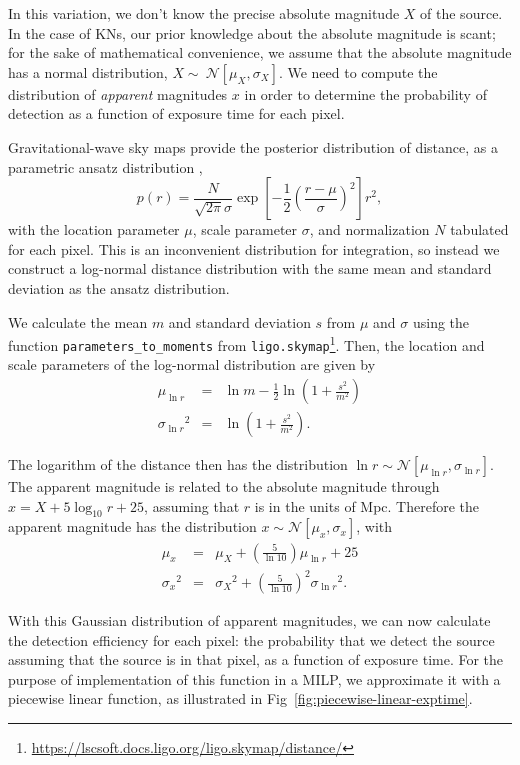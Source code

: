 \documentclass[twocolumn,times]{aastex631}
\begin{document}
In this variation, we don't know the precise absolute magnitude $X$ of the source. In the case of \acp{KN}, our prior knowledge about the absolute magnitude is scant; for the sake of mathematical convenience, we assume that the absolute magnitude has a normal distribution, $X \sim~ \mathcal{N}[\mu_X, \sigma_X]$. We need to compute the distribution of \textit{apparent} magnitudes $x$ in order to determine the probability of detection as a function of exposure time for each pixel.

Gravitational-wave sky maps provide the posterior distribution of distance, as a parametric ansatz distribution \citep{2016ApJ...829L..15S,2016ApJS..226...10S},
%
$$
    p(r) = \frac{N}{\sqrt{2 \pi}\sigma} \exp\left[-\frac{1}{2}\left(\frac{r - \mu}{\sigma}\right)^2\right] r^2,
$$
%
with the location parameter $\mu$, scale parameter $\sigma$, and normalization $N$ tabulated for each pixel. This is an inconvenient distribution for integration, so instead we construct a log-normal distance distribution with the same mean and standard deviation as the ansatz distribution.

We calculate the mean $m$ and standard deviation $s$ from $\mu$ and $\sigma$ using the function \texttt{parameters\_to\_moments} from \texttt{ligo.skymap}\footnote{\url{https://lscsoft.docs.ligo.org/ligo.skymap/distance/}}. Then, the location and scale parameters of the log-normal distribution are given by
%
\begin{eqnarray}
    \label{eq:log-distance-parameters}
    \mu_{\ln r} &=& \ln m - \frac{1}{2} \ln \left(1 + \frac{s^2}{m^2}\right) \\
    {\sigma_{\ln r}}^2 &=& \ln \left(1 + \frac{s^2}{m^2}\right).
\end{eqnarray}

The logarithm of the distance then has the distribution $\ln r \sim \mathcal{N}[\mu_{\ln r}, \sigma_{\ln r}]$. The apparent magnitude is related to the absolute magnitude through $x = X + 5 \log_{10} r + 25$, assuming that $r$ is in the units of Mpc. Therefore the apparent magnitude has the distribution $x \sim \mathcal{N}[\mu_x, \sigma_x]$, with
%
\begin{eqnarray}
    \label{eq:appmag-parameters}
    \mu_x &=& \mu_X + \left(\frac{5}{\ln 10}\right) \mu_{\ln r} + 25 \\
    {\sigma_x}^2 &=& {\sigma_{X}}^2 + \left(\frac{5}{\ln 10}\right)^2 {\sigma_{\ln r}}^2.
\end{eqnarray}

With this Gaussian distribution of apparent magnitudes, we can now calculate the detection efficiency for each pixel: the probability that we detect the source assuming that the source is in that pixel, as a function of exposure time. For the purpose of implementation of this function in a MILP, we approximate it with a piecewise linear function, as illustrated in Fig~\ref{fig:piecewise-linear-exptime}.
\end{document}
